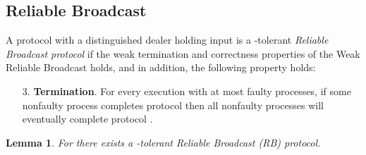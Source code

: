 \documentclass{sig-alternate}
\newtheorem{lemma}{Lemma}
\begin{document}
\subsection{Reliable Broadcast}
A protocol  with a distinguished dealer holding input  is a -tolerant \emph{Reliable Broadcast
protocol} if the weak termination and correctness properties of the Weak
Reliable Broadcast holds, and in addition, the following property holds:
\begin{enumerate}
\item[3.]
\textbf{Termination}. For every execution with at most  faulty
processes,
if some nonfaulty process completes protocol
 then all nonfaulty processes will eventually
complete protocol .
\end{enumerate}
\begin{lemma}
For  there exists a -tolerant \emph{Reliable Broadcast (RB) protocol}.
\end{lemma}
\end{document}
